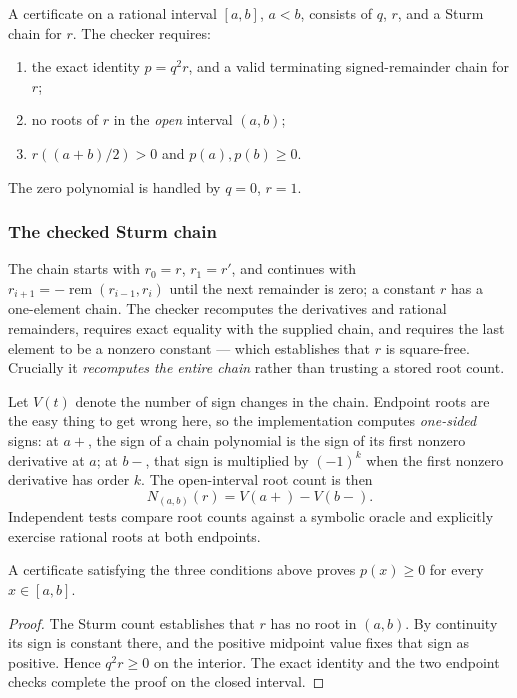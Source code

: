 A certificate on a rational interval $[a,b]$, $a<b$, consists of $q$, $r$, and a
Sturm chain for $r$. The checker requires:
\begin{enumerate}[leftmargin=1.4em]
\item the exact identity $p=q^2r$, and a valid terminating signed-remainder
  chain for $r$;
\item no roots of $r$ in the \emph{open} interval $(a,b)$;
\item $r((a+b)/2)>0$ and $p(a),p(b)\ge0$.
\end{enumerate}
The zero polynomial is handled by $q=0$, $r=1$.

\subsubsection*{The checked Sturm chain}

The chain starts with $r_0=r$, $r_1=r'$, and continues with
$r_{i+1}=-\operatorname{rem}(r_{i-1},r_i)$ until the next remainder is zero; a
constant $r$ has a one-element chain. The checker recomputes the derivatives and
rational remainders, requires exact equality with the supplied chain, and
requires the last element to be a nonzero constant --- which establishes that $r$
is square-free. Crucially it \emph{recomputes the entire chain} rather than
trusting a stored root count.

Let $V(t)$ denote the number of sign changes in the chain. Endpoint roots are
the easy thing to get wrong here, so the implementation computes \emph{one-sided}
signs: at $a+$, the sign of a chain polynomial is the sign of its first nonzero
derivative at $a$; at $b-$, that sign is multiplied by $(-1)^k$ when the first
nonzero derivative has order $k$. The open-interval root count is then
\[
 N_{(a,b)}(r)=V(a+)-V(b-).
\]
Independent tests compare root counts against a symbolic oracle and explicitly
exercise rational roots at both endpoints.

\begin{theorem}
A certificate satisfying the three conditions above proves $p(x)\ge0$ for every
$x\in[a,b]$.
\end{theorem}
\begin{proof}
The Sturm count establishes that $r$ has no root in $(a,b)$. By continuity its
sign is constant there, and the positive midpoint value fixes that sign as
positive. Hence $q^2r\ge0$ on the interior. The exact identity and the two
endpoint checks complete the proof on the closed interval.
\end{proof}

